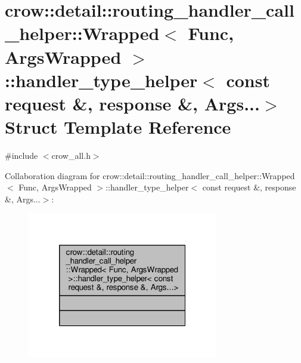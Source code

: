 \hypertarget{structcrow_1_1detail_1_1routing__handler__call__helper_1_1_wrapped_1_1handler__type__helper_3_01506e35faa94646c63b5476ce8ce1df0a}{\section{crow\-:\-:detail\-:\-:routing\-\_\-handler\-\_\-call\-\_\-helper\-:\-:Wrapped$<$ Func, Args\-Wrapped $>$\-:\-:handler\-\_\-type\-\_\-helper$<$ const request \&, response \&, Args...$>$ Struct Template Reference}
\label{structcrow_1_1detail_1_1routing__handler__call__helper_1_1_wrapped_1_1handler__type__helper_3_01506e35faa94646c63b5476ce8ce1df0a}
}


{\ttfamily \#include $<$crow\-\_\-all.\-h$>$}



Collaboration diagram for crow\-:\-:detail\-:\-:routing\-\_\-handler\-\_\-call\-\_\-helper\-:\-:Wrapped$<$ Func, Args\-Wrapped $>$\-:\-:handler\-\_\-type\-\_\-helper$<$ const request \&, response \&, Args...$>$\-:
\nopagebreak
\begin{figure}[H]
\begin{center}
\leavevmode
\includegraphics[width=236pt]{structcrow_1_1detail_1_1routing__handler__call__helper_1_1_wrapped_1_1handler__type__helper_3_01305569be121256957253743c991b96f0}
\end{center}
\end{figure}
